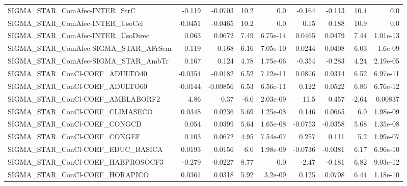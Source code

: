 \begin{tabular}{lrrrrrrrr}
SIGMA\_STAR\_ComAfec-INTER\_StrC          &      -0.119 &      -0.0703 &     10.2 &      0.0 &     -0.164 &      -0.113 &         10.4 &           0.0 \\
SIGMA\_STAR\_ComAfec-INTER\_UsoCel        &     -0.0451 &      -0.0465 &     10.2 &      0.0 &       0.15 &       0.188 &         10.9 &           0.0 \\
SIGMA\_STAR\_ComAfec-INTER\_UsoDirec      &       0.063 &       0.0672 &     7.49 & 6.75e-14 &     0.0465 &      0.0479 &         7.44 &      1.01e-13 \\
SIGMA\_STAR\_ComAfec-SIGMA\_STAR\_AFrSem   &       0.119 &        0.168 &     6.16 & 7.05e-10 &     0.0244 &      0.0408 &         6.03 &       1.6e-09 \\
SIGMA\_STAR\_ComAfec-SIGMA\_STAR\_AmbTr    &       0.167 &        0.124 &     4.78 & 1.75e-06 &     -0.354 &      -0.283 &         4.24 &      2.19e-05 \\
SIGMA\_STAR\_ConCl-COEF\_ADULTO40         &     -0.0354 &      -0.0182 &     6.52 & 7.12e-11 &     0.0876 &      0.0314 &         6.52 &      6.97e-11 \\
SIGMA\_STAR\_ConCl-COEF\_ADULTO60         &     -0.0144 &     -0.00856 &     6.53 & 6.56e-11 &      0.122 &      0.0522 &         6.86 &      6.76e-12 \\
SIGMA\_STAR\_ConCl-COEF\_AMBLABORF2       &        4.86 &         0.37 &     -6.0 & 2.03e-09 &       11.5 &       0.457 &        -2.64 &       0.00837 \\
SIGMA\_STAR\_ConCl-COEF\_CLIMASECO        &      0.0348 &       0.0236 &     5.69 & 1.25e-08 &      0.146 &      0.0665 &          6.0 &      1.98e-09 \\
SIGMA\_STAR\_ConCl-COEF\_CONGCD           &       0.054 &       0.0399 &     5.64 & 1.65e-08 &    -0.0753 &     -0.0358 &         5.68 &      1.35e-08 \\
SIGMA\_STAR\_ConCl-COEF\_CONGEF           &       0.103 &       0.0672 &     4.95 & 7.54e-07 &      0.257 &       0.111 &          5.2 &      1.99e-07 \\
SIGMA\_STAR\_ConCl-COEF\_EDUC\_BASICA      &      0.0193 &       0.0156 &      6.0 & 1.98e-09 &    -0.0736 &     -0.0381 &         6.17 &      6.96e-10 \\
SIGMA\_STAR\_ConCl-COEF\_HABPROSOCF3      &      -0.279 &      -0.0227 &     8.77 &      0.0 &      -2.47 &      -0.181 &         6.82 &      9.03e-12 \\
SIGMA\_STAR\_ConCl-COEF\_HORAPICO         &      0.0361 &       0.0318 &     5.92 &  3.2e-09 &      0.125 &      0.0708 &         6.44 &      1.18e-10 \\

\end{tabular}
